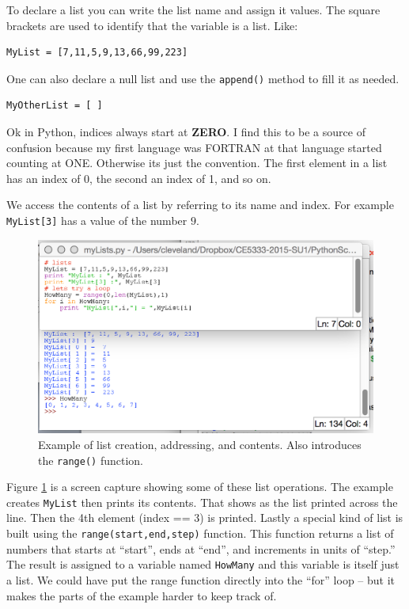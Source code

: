 To declare a list you can write the list name and assign it values.  The square brackets are used to identify that the variable is a list.  Like:
\begin{verbatim}
MyList = [7,11,5,9,13,66,99,223]
\end{verbatim}

One can also declare a null list and use the \texttt{append()} method to fill it as needed.   
\begin{verbatim}
MyOtherList = [ ]
\end{verbatim}

Ok in Python, indices always start at \textbf{ZERO}.  I find this to be a source of confusion because my first language was FORTRAN at that language started counting at ONE.  Otherwise its just the convention.  The first element in a list has an index of 0, the second an index of 1, and so on.

We access the contents of a list by referring to its name and index.  For example
\texttt{MyList[3]} has a value of the number $9$.



\begin{figure}[h!] %
   \centering
   \includegraphics[width=5in]{./4-DataTypes/ListExample.jpg} 
   \caption{Example of list creation, addressing, and contents.  Also introduces the \texttt{range()} function.}
   \label{fig:ListExample}
\end{figure}

Figure \ref{fig:ListExample} is a screen capture showing some of these list operations.  The example creates \texttt{MyList} then prints its contents.  That shows as the list printed across the line.   Then the 4th element (index == 3) is printed.   Lastly a special kind of list is built using the \texttt{range(start,end,step)} function.  This function returns a list of numbers that starts at ``start'', ends at ``end'', and increments in units of ``step.''   The result is assigned to a variable named \texttt{HowMany} and this variable is itself just a list.   We could have put the range function directly into the ``for'' loop -- but it makes the parts of the example harder to keep track of.

